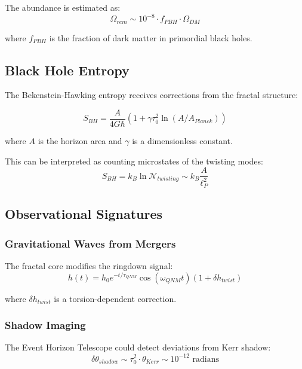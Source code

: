 The abundance is estimated as:
\begin{equation}
    \Omega_{rem} \sim 10^{-8} \cdot f_{PBH} \cdot \Omega_{DM}
\end{equation}

where $f_{PBH}$ is the fraction of dark matter in primordial black holes.

\subsection{Black Hole Entropy}

The Bekenstein-Hawking entropy receives corrections from the fractal structure:

\begin{equation}
    S_{BH} = \frac{A}{4G\hbar}(1 + \gamma \tau_0^2 \ln(A/A_{Planck}))
\end{equation}

where $A$ is the horizon area and $\gamma$ is a dimensionless constant.

This can be interpreted as counting microstates of the twisting modes:
\begin{equation}
    S_{BH} = k_B \ln \mathcal{N}_{twisting} \sim k_B \frac{A}{\ell_P^2}
\end{equation}

\subsection{Observational Signatures}

\subsubsection{Gravitational Waves from Mergers}

The fractal core modifies the ringdown signal:
\begin{equation}
    h(t) = h_0 e^{-t/\tau_{QNM}} \cos(\omega_{QNM}t)(1 + \delta h_{twist})
\end{equation}

where $\delta h_{twist}$ is a torsion-dependent correction.

\subsubsection{Shadow Imaging}

The Event Horizon Telescope could detect deviations from Kerr shadow:
\begin{equation}
    \delta \theta_{shadow} \sim \tau_0^2 \cdot \theta_{Kerr} \sim 10^{-12} \text{ radians}
\end{equation}

